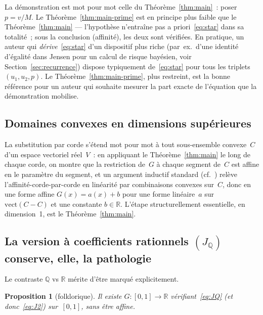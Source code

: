 \documentclass[11pt,a4paper]{amsart}
\newtheorem{proposition}[theorem]{Proposition}
\newcommand{\R}{\mathbb R}
\newcommand{\Q}{\mathbb Q}
\begin{document}
La démonstration est mot pour mot celle du Théorème~\ref{thm:main}~: poser
$p = v/M$. Le Théorème~\ref{thm:main-prime} est en principe plus faible que
le Théorème~\ref{thm:main} --- l'hypothèse n'entraîne pas a
priori~\eqref{eq:star} dans sa totalité~; sous la conclusion (affinité),
les deux sont vérifiées. En pratique, un auteur qui
\emph{dérive}~\eqref{eq:star} d'un dispositif plus riche (par~ex.~d'une
identité d'égalité dans Jensen pour un calcul de risque bayésien, voir
Section~\ref{sec:recurrence}) dispose typiquement de~\eqref{eq:star} pour
tous les triplets $(u_1, u_2, p)$. Le Théorème~\ref{thm:main-prime}, plus
restreint, est la bonne référence pour un auteur qui souhaite mesurer la
part exacte de l'équation que la démonstration mobilise.

\subsection{Domaines convexes en dimensions supérieures}
\label{ssec:higher}

La substitution par corde s'étend mot pour mot à tout sous-ensemble
convexe~$C$ d'un espace vectoriel réel~$V$~: en appliquant le
Théorème~\ref{thm:main} le long de chaque corde, on montre que la
restriction de~$G$ à chaque segment de~$C$ est affine en le paramètre du
segment, et un argument inductif standard (cf.~\cite{AczelDhombres1989})
relève l'affinité-corde-par-corde en linéarité par combinaisons convexes
sur~$C$, donc en une forme affine $G(x) = a(x) + b$ pour une forme
linéaire~$a$ sur $\mathrm{vect}(C - C)$ et une constante $b \in \R$.
L'étape structurellement essentielle, en dimension~1, est le
Théorème~\ref{thm:main}.

\subsection{La version à coefficients rationnels $(J_{\Q})$ conserve,
elle, la pathologie}
\label{ssec:rational-pathology}

Le contraste $\Q$ vs $\R$ mérite d'être marqué explicitement.

\begin{proposition}[folklorique]
\label{prop:JQ-pathology}
Il existe $G\colon[0, 1] \to \R$ vérifiant~\eqref{eq:JQ} (et
donc~\eqref{eq:J2}) sur~$[0, 1]$, sans être affine.
\end{proposition}
\end{document}
